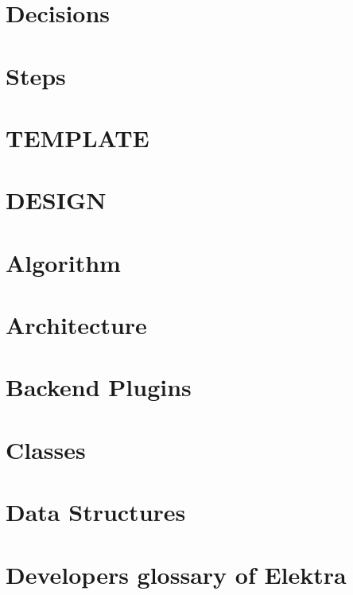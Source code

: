 \let\mypdfximage\pdfximage\def\pdfximage{\immediate\mypdfximage}\documentclass[twoside]{book}
\newcommand{\+}{\discretionary{\mbox{\scriptsize$\hookleftarrow$}}{}{}}
\begin{document}
\chapter{Decisions}
\label{doc_decisions_README_md}

\chapter{Steps}
\label{doc_decisions_STEPS_md}

\chapter{TEMPLATE}
\label{doc_decisions_TEMPLATE_md}

\chapter{DESIGN}
\label{doc_DESIGN_md}

\chapter{Algorithm}
\label{doc_dev_algorithm_md}

\chapter{Architecture}
\label{doc_dev_architecture_md}

\chapter{Backend Plugins}
\label{doc_dev_backend-plugins_md}

\chapter{Classes}
\label{doc_dev_classes_md}

\chapter{Data Structures}
\label{doc_dev_data-structures_md}

\chapter{Developer\textquotesingle{}s glossary of Elektra}
\label{doc_dev_dev-glossary_md}

\end{document}
